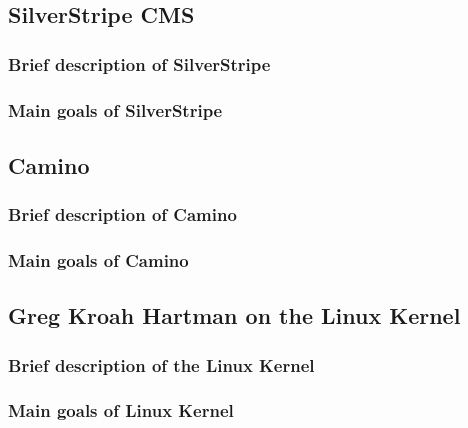 \documentclass[11pt]{article} %
\begin{document}
\subsection{SilverStripe CMS}


\subsubsection{Brief description of SilverStripe}

\subsubsection{Main goals of SilverStripe}


\subsection{Camino}


\subsubsection{Brief description of Camino}

\subsubsection{Main goals of Camino}


\subsection{Greg Kroah Hartman on the Linux Kernel}


\subsubsection{Brief description of the Linux Kernel}

\subsubsection{Main goals of Linux Kernel}
\end{document}
